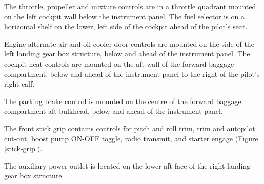The throttle, propeller and mixture controls are in a throttle quadrant mounted on the left cockpit wall below the instrument panel. The fuel selector is on a horizontal shelf on the lower, left side of the cockpit ahead of the pilot's seat.

Engine alternate air and oil cooler door controls are mounted on the side of the left landing gear box structure, below and ahead of the instrument panel. The cockpit heat controls are mounted on the aft wall of the forward baggage compartment, below and ahead of the instrument panel to the right of the pilot's right calf. 

The parking brake control is mounted on the centre of the forward baggage compartment aft bulkhead, below and ahead of the instrument panel.

The front stick grip contains controls for pitch and roll trim, trim and autopilot cut-out, boost pump ON-OFF toggle, radio transmit, and starter engage (Figure \ref{stick-grip}).

The auxiliary power outlet is located on the lower aft face of the right landing gear box structure.


